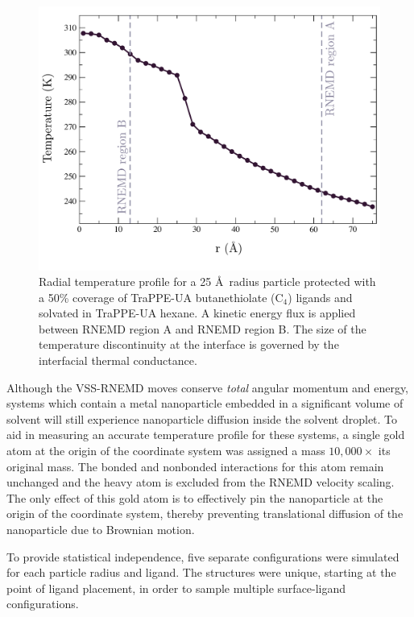 \begin{figure}
	\includegraphics[width=\linewidth]{figures/temp_profile}
	\caption{Radial temperature profile for a 25 \AA\ radius
          particle protected with a 50\% coverage of TraPPE-UA
          butanethiolate (C$_4$) ligands and solvated in TraPPE-UA
          hexane. A kinetic energy flux is applied between RNEMD
          region A and RNEMD region B. The size of the temperature
          discontinuity at the interface is governed by the
          interfacial thermal conductance.}
	\label{fig:temp_profile}
\end{figure}

Although the VSS-RNEMD moves conserve \emph{total} angular momentum
and energy, systems which contain a metal nanoparticle embedded in a
significant volume of solvent will still experience nanoparticle
diffusion inside the solvent droplet. To aid in measuring an accurate
temperature profile for these systems, a single gold atom at the
origin of the coordinate system was assigned a mass $10,000 \times$
its original mass. The bonded and nonbonded interactions for this atom
remain unchanged and the heavy atom is excluded from the RNEMD
velocity scaling.  The only effect of this gold atom is to effectively
pin the nanoparticle at the origin of the coordinate system, thereby
preventing translational diffusion of the nanoparticle due to Brownian
motion.

To provide statistical independence, five separate configurations were
simulated for each particle radius and ligand. The structures were
unique, starting at the point of ligand placement, in order to sample
multiple surface-ligand configurations.


